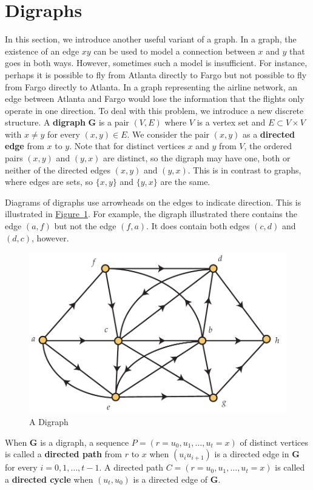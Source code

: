 \documentclass[10pt,]{book}
\newcommand{\terminology}[1]{\textbf{#1}}
\theoremstyle{plain}
\theoremstyle{definition}
\theoremstyle{definition}
\theoremstyle{definition}
\theoremstyle{definition}
\numberwithin{equation}{section}
\newcommand{\bfG}{\mathbf{G}}
\begin{document}
\section[{Digraphs}]{Digraphs}\label{s_graphalgorithms_digraphs}
\hypertarget{p-184}{}%
In this section, we introduce another useful variant of a graph. In a graph, the existence of an edge \(xy\) can be used to model a connection between \(x\) and \(y\) that goes in both ways. However, sometimes such a model is insufficient. For instance, perhaps it is possible to fly from Atlanta directly to Fargo but not possible to fly from Fargo directly to Atlanta. In a graph representing the airline network, an edge between Atlanta and Fargo would lose the information that the flights only operate in one direction. To deal with this problem, we introduce a new discrete structure. A \terminology{digraph} \(\bfG\) is a pair \((V,E)\) where \(V\) is a vertex set and \(E\subset V\times V\) with \(x\neq y\) for every \((x,y)\in E\). We consider the pair \((x,y)\) as a \terminology{directed edge} from \(x\) to \(y\). Note that for distinct vertices \(x\) and \(y\) from \(V\), the ordered pairs \((x,y)\) and \((y,x)\) are distinct, so the digraph may have one, both or neither of the directed edges \((x,y)\) and \((y,x)\). This is in contrast to graphs, where edges are sets, so \(\{x,y\}\) and \(\{y,x\}\) are the same.%
\par
\hypertarget{p-185}{}%
Diagrams of digraphs use arrowheads on the edges to indicate direction.  This is illustrated in \hyperref[fig_graphalgorithms_digraph]{Figure~\ref{fig_graphalgorithms_digraph}}. For example, the digraph illustrated there contains the edge \((a,f)\) but not the edge \((f,a)\). It does contain both edges \((c,d)\) and \((d,c)\), however.%
\begin{figure}
\centering
\includegraphics[width=0.85\linewidth]{images/digraph}
\caption{A Digraph\label{fig_graphalgorithms_digraph}}
\end{figure}
\hypertarget{p-186}{}%
When \(\bfG\) is a digraph, a sequence \(P=(r=u_0,u_1,\dots,u_t=x)\) of distinct vertices is called a \terminology{directed path} from \(r\) to \(x\) when \((u_iu_{i+1})\) is a directed edge in \(\bfG\) for every \(i=0,1,\dots,t-1\). A directed path \(C=(r=u_0,u_1,\dots,u_t=x)\) is called a \terminology{directed cycle} when \((u_t,u_0)\) is a directed edge of \(\bfG\).%
\typeout{************************************************}
\typeout{************************************************}
\end{document}
